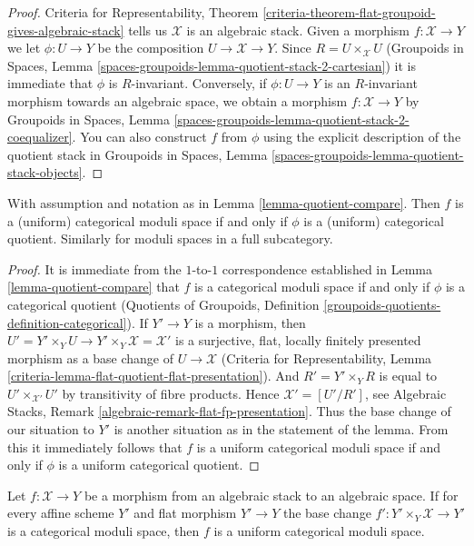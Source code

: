 \begin{proof}
Criteria for Representability, Theorem
\ref{criteria-theorem-flat-groupoid-gives-algebraic-stack}
tells us $\mathcal{X}$ is an algebraic stack.
Given a morphism $f : \mathcal{X} \to Y$ we let $\phi : U \to Y$ be
the composition $U \to \mathcal{X} \to Y$. Since $R = U \times_\mathcal{X} U$
(Groupoids in Spaces, Lemma
\ref{spaces-groupoids-lemma-quotient-stack-2-cartesian})
it is immediate that $\phi$ is $R$-invariant.
Conversely, if $\phi : U \to Y$ is an $R$-invariant morphism towards
an algebraic space, we obtain a morphism
$f : \mathcal{X} \to Y$ by
Groupoids in Spaces, Lemma
\ref{spaces-groupoids-lemma-quotient-stack-2-coequalizer}.
You can also construct $f$ from $\phi$ using the explicit description of
the quotient stack in
Groupoids in Spaces, Lemma
\ref{spaces-groupoids-lemma-quotient-stack-objects}.
\end{proof}

\begin{lemma}
\label{lemma-categorical-quotient-compare}
With assumption and notation as in Lemma \ref{lemma-quotient-compare}.
Then $f$ is a (uniform) categorical moduli space
if and only if $\phi$ is a (uniform) categorical quotient.
Similarly for moduli spaces in a full subcategory.
\end{lemma}

\begin{proof}
It is immediate from the $1$-to-$1$ correspondence established in
Lemma \ref{lemma-quotient-compare} that $f$ is a categorical moduli space
if and only if $\phi$ is a categorical quotient
(Quotients of Groupoids, Definition
\ref{groupoids-quotients-definition-categorical}).
If $Y' \to Y$ is a morphism, then
$U' = Y' \times_Y U \to Y' \times_Y \mathcal{X} = \mathcal{X}'$
is a surjective, flat, locally finitely presented morphism
as a base change of $U \to \mathcal{X}$
(Criteria for Representability, Lemma
\ref{criteria-lemma-flat-quotient-flat-presentation}).
And $R' = Y' \times_Y R$ is equal to $U' \times_{\mathcal{X}'} U'$
by transitivity of fibre products.
Hence $\mathcal{X}' = [U'/R']$, see
Algebraic Stacks, Remark \ref{algebraic-remark-flat-fp-presentation}.
Thus the base change of our situation to $Y'$ is another situation
as in the statement of the lemma. From this it immediately
follows that $f$ is a uniform categorical moduli space
if and only if $\phi$ is a uniform categorical quotient.
\end{proof}

\begin{lemma}
\label{lemma-check-uniform-categorical-quotient-on-affines}
Let $f : \mathcal{X} \to Y$ be a morphism from an algebraic stack
to an algebraic space. If for every affine scheme $Y'$ and flat
morphism $Y' \to Y$ the base change
$f' : Y' \times_Y \mathcal{X} \to Y'$ is a categorical moduli space,
then $f$ is a uniform categorical moduli space.
\end{lemma}

